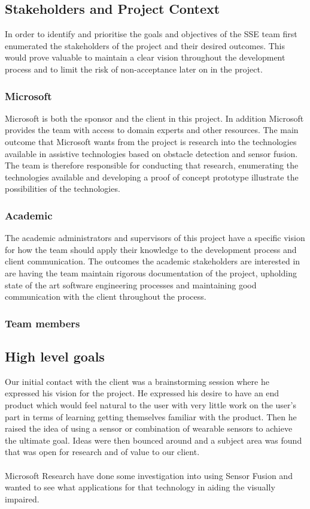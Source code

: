 \documentclass[prodmode,acmtosem]{acmsmall} %
\begin{document}
\subsection{Stakeholders and Project Context}
In order to identify and prioritise the goals and objectives of the SSE team first enumerated the stakeholders of the project and their desired outcomes. This would prove valuable to maintain a clear vision throughout the development process and to limit the risk of non-acceptance later on in the project.

\subsubsection{Microsoft}
Microsoft is both the sponsor and the client in this project. In addition Microsoft provides the team with access to domain experts and other resources.
The main outcome that Microsoft wants from the project is research into the technologies available in assistive technologies based on obstacle detection and sensor fusion. The team is therefore responsible for conducting that research, enumerating the technologies available and developing a proof of concept prototype illustrate the possibilities of the technologies.

\subsubsection{Academic}
The academic administrators and supervisors of this project have a specific vision for how the team should apply their knowledge to the development process and client communication.
The outcomes the academic stakeholders are interested in are having the team maintain rigorous documentation of the project, upholding state of the art software engineering processes and maintaining good communication with the client throughout the process.


\subsubsection{Team members}


\subsection{High level goals}



Our initial contact with the client was a brainstorming session where he expressed his vision for the project. He expressed his desire to have an end product which would feel natural to the user with very little work on the user's part in terms of learning getting themselves familiar with the product. Then he raised the idea of using a sensor or combination of wearable sensors to achieve the ultimate goal. Ideas were then bounced around and a subject area was found that was open for research and of value to our client.\\\\
Microsoft Research have done some investigation into using Sensor Fusion
and wanted to see what applications for that technology in aiding the visually impaired. 
\end{document}
